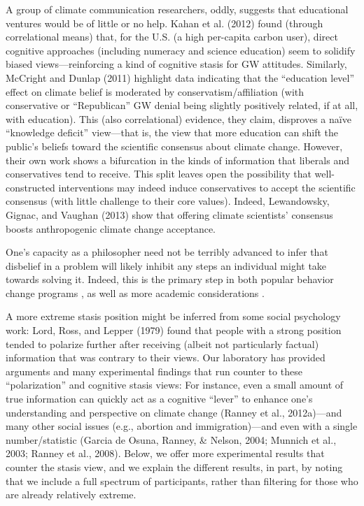 A group of climate communication researchers, oddly, suggests that educational
ventures would be of little or no help.  Kahan et al. (2012) found (through
correlational means) that, for the U.S. (a high per-capita carbon user), direct
cognitive approaches (including numeracy and science education) seem to solidify
biased views---reinforcing a kind of cognitive stasis for GW attitudes.
Similarly, McCright and Dunlap (2011) highlight data indicating that the
``education level'' effect on climate belief is moderated by
conservatism/affiliation (with conservative or ``Republican'' GW denial being
slightly positively related, if at all, with education). This (also
correlational) evidence, they claim, disproves a naïve ``knowledge deficit''
view---that is, the view that more education can shift the public's beliefs
toward the scientific consensus about climate change. However, their own work
shows a bifurcation in the kinds of information that liberals and conservatives
tend to receive. This split leaves open the possibility that well-constructed
interventions may indeed induce conservatives to accept the scientific consensus
(with little challenge to their core values).  Indeed, Lewandowsky, Gignac, and
Vaughan (2013) show that offering climate scientists' consensus boosts
anthropogenic climate change acceptance.

One’s capacity as a philosopher need not be
terribly advanced to infer that disbelief in a problem will likely inhibit any
steps an individual might take towards solving it. Indeed, this is the primary
step in both popular behavior change programs \cite{twelve-step}, as well as
more academic considerations \cite{ELM}.

A more extreme stasis position might be inferred from some social psychology
work: Lord, Ross, and Lepper (1979) found that people with a strong position
tended to polarize further after receiving (albeit not particularly factual)
information that was contrary to their views. Our laboratory has provided
arguments and many experimental findings that run counter to these
``polarization'' and cognitive stasis views: For instance, even a small amount of
true information can quickly act as a cognitive ``lever'' to enhance one's
understanding and perspective on climate change (Ranney et al., 2012a)---and many
other social issues (e.g., abortion and immigration)---and even with a single
number/statistic (Garcia de Osuna, Ranney, \& Nelson, 2004; Munnich et al., 2003;
Ranney et al., 2008). Below, we offer more experimental results that counter the
stasis view, and we explain the different results, in part, by noting that we
include a full spectrum of participants, rather than filtering for those who are
already relatively extreme.


